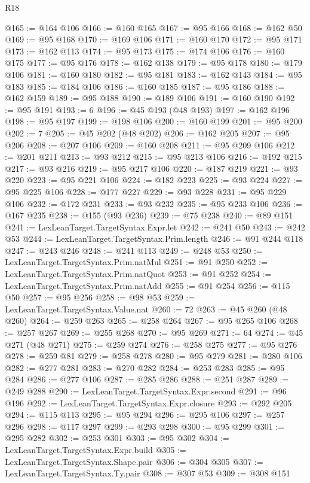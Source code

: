 \begin{lexlean}{R18}
\begin{coremodule}
@165 := @164 @106
@166 := @160 @165
@167 := @95 @166
@168 := @162 @50
@169 := @95 @168
@170 := @169 @106
@171 := @160 @170
@172 := @95 @171
@173 := @162 @113
@174 := @95 @173
@175 := @174 @106
@176 := @160 @175
@177 := @95 @176
@178 := @162 @138
@179 := @95 @178
@180 := @179 @106
@181 := @160 @180
@182 := @95 @181
@183 := @162 @143
@184 := @95 @183
@185 := @184 @106
@186 := @160 @185
@187 := @95 @186
@188 := @162 @159
@189 := @95 @188
@190 := @189 @106
@191 := @160 @190
@192 := @95 @191
@193 := 6
@196 := @45 @193 (@48 @193)
@197 := @162 @196
@198 := @95 @197
@199 := @198 @106
@200 := @160 @199
@201 := @95 @200
@202 := 7
@205 := @45 @202 (@48 @202)
@206 := @162 @205
@207 := @95 @206
@208 := @207 @106
@209 := @160 @208
@211 := @95 @209 @106
@212 := @201 @211
@213 := @93 @212
@215 := @95 @213 @106
@216 := @192 @215
@217 := @93 @216
@219 := @95 @217 @106
@220 := @187 @219
@221 := @93 @220
@223 := @95 @221 @106
@224 := @182 @223
@225 := @93 @224
@227 := @95 @225 @106
@228 := @177 @227
@229 := @93 @228
@231 := @95 @229 @106
@232 := @172 @231
@233 := @93 @232
@235 := @95 @233 @106
@236 := @167 @235
@238 := @155 (@93 @236)
@239 := @75 @238
@240 := @89 @151
@241 := LexLeanTarget.TargetSyntax.Expr.let
@242 := @241 @50
@243 := @242 @53
@244 := LexLeanTarget.TargetSyntax.Prim.length
@246 := @91 @244 @118
@247 := @243 @246
@248 := @241 @113
@249 := @248 @53
@250 := LexLeanTarget.TargetSyntax.Prim.natMul
@251 := @91 @250
@252 := LexLeanTarget.TargetSyntax.Prim.natQuot
@253 := @91 @252
@254 := LexLeanTarget.TargetSyntax.Prim.natAdd
@255 := @91 @254
@256 := @115 @50
@257 := @95 @256
@258 := @98 @53
@259 := LexLeanTarget.TargetSyntax.Value.nat
@260 := 72
@263 := @45 @260 (@48 @260)
@264 := @259 @263
@265 := @258 @264
@267 := @95 @265 @106
@268 := @257 @267
@269 := @255 @268
@270 := @95 @269
@271 := 64
@274 := @45 @271 (@48 @271)
@275 := @259 @274
@276 := @258 @275
@277 := @95 @276
@278 := @259 @81
@279 := @258 @278
@280 := @95 @279
@281 := @280 @106
@282 := @277 @281
@283 := @270 @282
@284 := @253 @283
@285 := @95 @284
@286 := @277 @106
@287 := @285 @286
@288 := @251 @287
@289 := @249 @288
@290 := LexLeanTarget.TargetSyntax.Expr.second
@291 := @96 @196
@292 := LexLeanTarget.TargetSyntax.Expr.closure
@293 := @292 @205
@294 := @115 @113
@295 := @95 @294
@296 := @295 @106
@297 := @257 @296
@298 := @117 @297
@299 := @293 @298
@300 := @95 @299
@301 := @295 @282
@302 := @253 @301
@303 := @95 @302
@304 := LexLeanTarget.TargetSyntax.Expr.build
@305 := LexLeanTarget.TargetSyntax.Shape.pair
@306 := @304 @305
@307 := LexLeanTarget.TargetSyntax.Ty.pair
@308 := @307 @53
@309 := @308 @151

\end{coremodule}
\end{lexlean}
